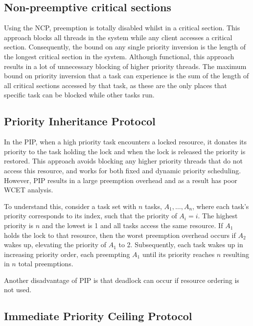 \subsection{Non-preemptive critical sections}

Using the \gls{NCP}, preemption is totally disabled whilst in a critical section.  This approach blocks
all threads in the system while any client accesses a critical section.  Consequently, the bound on
any single priority inversion is the length of the longest critical section in the system.  Although
functional, this approach results in a lot of unnecessary blocking of higher priority threads.  The
maximum bound on priority inversion that a task can experience is the sum of the length of all
critical sections accessed by that task, as these are the only places that specific task can be
blocked while other tasks run. 

\subsection{Priority Inheritance Protocol}
\label{sec:pip}

In the \gls{PIP}, when a high priority task encounters a locked resource, it donates its priority 
to the task holding the lock and when the lock is released the priority is restored. 
This approach avoids blocking any higher priority threads that do not access this resource, and
works for both fixed and dynamic priority scheduling.
However, \gls{PIP} results in a large preemption overhead and as a result has poor WCET analysis.

To understand this, consider a task set with $n$ tasks, $A_{1}, \ldots, A_{n}$, where each task's priority
corresponds to its index, such that the priority of $A_{i} = i$. The highest priority is $n$ and the
lowest is 1 and all tasks access the same resource. If $A_{1}$ holds the lock to that resource, then
the worst preemption overhead occurs if $A_{2}$ wakes up, elevating the priority of $A_{1}$ to 2. Subsequently,
each task wakes up in increasing priority order, each preempting $A_{1}$ until its priority reaches
$n$ resulting in $n$ total preemptions. 

Another disadvantage of \gls{PIP} is that deadlock can occur if resource ordering is not used.


\subsection{Immediate Priority Ceiling Protocol}
\label{sec:hlp}
\label{sec:ipcp}

